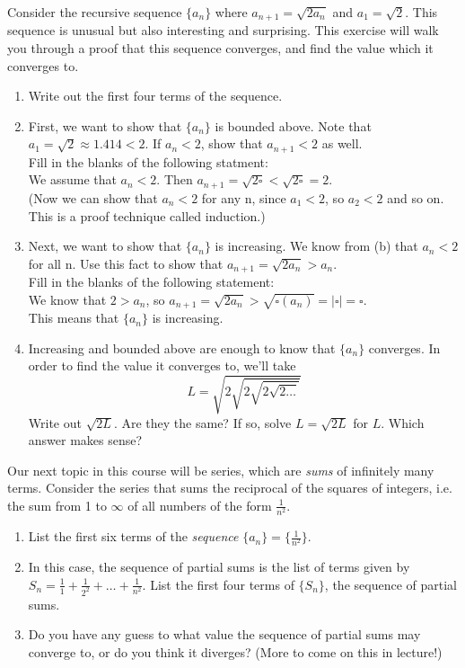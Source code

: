 \documentclass{ximera}
\begin{document}
\begin{exercise}
     Consider the recursive sequence $\{a_n\}$ where $a_{n+1}=\sqrt{2a_n}$ and $a_1=\sqrt{2}$. This sequence is unusual but also interesting and surprising.  This exercise will walk you through a proof that this sequence converges, and find the value which it converges to.
\begin{enumerate}
    \item Write out the first four terms of the sequence.
    \vspace{.5in}
    \item First, we want to show that $\{a_n\}$ is bounded above. Note that $a_1=\sqrt{2}\approx1.414<2$.  If $a_n<2$, show that $a_{n+1}<2$ as well.  \\
    Fill in the blanks of the following statment:\\
    We assume that $a_n<2$.  Then $a_{n+1}=\sqrt{2\square}<\sqrt{2\square}=2$.\\
    (Now we can show that $a_n<2$ for any n, since $a_1<2$, so $a_2<2$ and so on. This is a proof technique called induction.)
    \item Next, we want to show that $\{a_n\}$ is increasing.  We know from (b) that $a_n<2$ for all n.  Use this fact to show that $a_{n+1}=\sqrt{2a_n}>a_n.$\\
    Fill in the blanks of the following statement:\\
    We know that $2>a_n$, so $a_{n+1}=\sqrt{2a_n}>\sqrt{\square(a_n)}=|\square|=\square$. \\
    This means that $\{a_n\}$ is increasing.
    \item Increasing and bounded above are enough to know that $\{a_n\}$ converges.  In order to find the value it converges to, we'll take $$L=\sqrt{2\sqrt{2\sqrt{2\sqrt{2\dots}}}}$$  Write out $\sqrt{2L}$.  Are they the same?  If so, solve $L=\sqrt{2L}$ for $L$.  Which answer makes sense?
\end{enumerate}

\end{exercise}

\begin{exercise}
    Our next topic in this course will be series, which are \textit{sums} of infinitely many terms.  Consider the series that sums the reciprocal of the squares of integers, i.e. the sum from 1 to $\infty$ of all numbers of the form $\frac{1}{n^2}$.
    \begin{enumerate}
        \item List the first six terms of the \textit{sequence} $\{a_n\}=\{\frac{1}{n^2}\}$.
        \item In this case, the sequence of partial sums is the list of terms given by $S_n=\frac{1}{1}+\frac{1}{2^2}+\dots +\frac{1}{n^2}$. List the first four terms of $\{S_n\}$, the sequence of partial sums.
        \item Do you have any guess to what value the sequence of partial sums may converge to, or do you think it diverges?  (More to come on this in lecture!)
    \end{enumerate}
\end{exercise}
\end{document}
